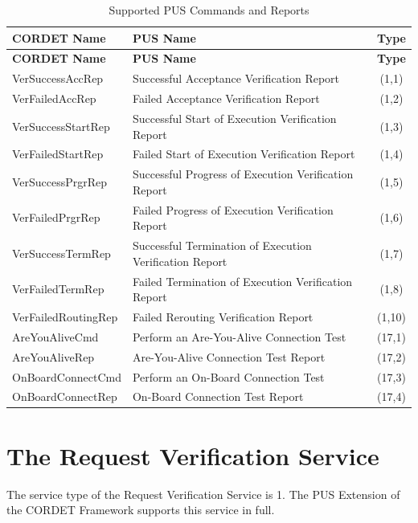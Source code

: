 \documentclass[a4paper,10pt]{article}
\let\stdsection\section
\renewcommand\section{\newpage\stdsection}
\begin{document}
\begin{longtable}{|l|>{\raggedright\arraybackslash}p{9cm}||c|}
\caption{Supported PUS Commands and Reports}\label{tab:supportedPus} \\
\hline
\rowcolor{light-gray}
\textbf{CORDET Name} & \textbf{PUS Name} & \textbf{Type} \\
\hline\hline
\endfirsthead
\rowcolor{light-gray}
\textbf{CORDET Name} & \textbf{PUS Name} & \textbf{Type} \\
\hline\hline
\endhead
VerSuccessAccRep & Successful Acceptance Verification Report & (1,1) \\
\hline
VerFailedAccRep & Failed Acceptance Verification Report & (1,2) \\
\hline
VerSuccessStartRep & Successful Start of Execution Verification Report & (1,3) \\
\hline
VerFailedStartRep & Failed Start of Execution  Verification Report & (1,4) \\
\hline
VerSuccessPrgrRep & Successful Progress of Execution Verification Report & (1,5) \\
\hline
VerFailedPrgrRep & Failed Progress of Execution Verification Report & (1,6) \\
\hline
VerSuccessTermRep & Successful Termination of Execution Verification Report & (1,7) \\
\hline
VerFailedTermRep & Failed Termination of Execution Verification Report & (1,8) \\
\hline
VerFailedRoutingRep & Failed Rerouting Verification Report & (1,10) \\
\hline
AreYouAliveCmd & Perform an Are-You-Alive Connection Test & (17,1) \\
\hline
AreYouAliveRep & Are-You-Alive Connection Test Report & (17,2) \\
\hline
OnBoardConnectCmd & Perform an On-Board Connection Test & (17,3) \\
\hline
OnBoardConnectRep & On-Board Connection Test Report & (17,4) \\
\hline
\end{longtable}  


\section{The Request Verification Service}\label{sec:serv1}
The service type of the Request Verification Service is 1. The PUS Extension of the CORDET Framework supports this service in full.
\end{document}
